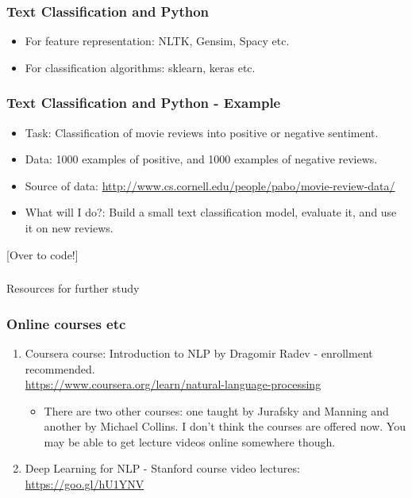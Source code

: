 \documentclass{beamer}
\begin{document}
\begin{frame}
\frametitle{Text Classification and Python}
\begin{itemize}
\item For feature representation: NLTK, Gensim, Spacy etc.
\item For classification algorithms: sklearn, keras etc. 
\end{itemize}
\end{frame}

\begin{frame}
\frametitle{Text Classification and Python - Example}
\begin{itemize}
\item Task: Classification of movie reviews into positive or negative sentiment.
\item Data: 1000 examples of positive, and 1000 examples of negative reviews.
\item Source of data: \url{http://www.cs.cornell.edu/people/pabo/movie-review-data/}
\item What will I do?: Build a small text classification model, evaluate it, and use it on new reviews.
\end{itemize}

[Over to code!]
\end{frame}

\begin{frame}
\frametitle{}
\Large Resources for further study
\end{frame}

\begin{frame}
\frametitle{Online courses etc}
\begin{enumerate}
\item Coursera course: Introduction to NLP by Dragomir Radev - enrollment recommended. 
\\ \url{https://www.coursera.org/learn/natural-language-processing}
\begin{itemize}
\item There are two other courses: one taught by Jurafsky and Manning and another by Michael Collins. I don't think the courses are offered now. You may be able to get lecture videos online somewhere though.
\end{itemize}
\item Deep Learning for NLP - Stanford course video lectures: \url{https://goo.gl/hU1YNV}
\end{enumerate}
\end{frame}
\end{document}
